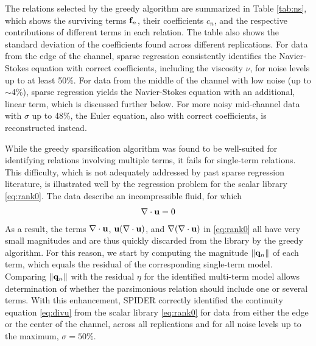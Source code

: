 \documentclass[
 reprint,
 amsmath,amssymb,
 aps,
]{revtex4-2}
\begin{document}
The relations selected by the greedy algorithm are summarized in Table \ref{tab:ns}, which shows the surviving terms ${\bf f}_n$, their coefficients $c_n$, and the respective contributions of different terms in each relation. The table also shows the standard deviation of the coefficients found across different replications. For data from the edge of the channel, sparse regression consistently identifies the Navier-Stokes equation with correct coefficients, including the viscosity $\nu$, for noise levels up to at least 50\%. For data from the middle of the channel with low noise (up to $\sim$4\%), sparse regression yields the Navier-Stokes equation with an additional, linear term, which is discussed further below. For more noisy mid-channel data with $\sigma$ up to 48\%, the Euler equation, also with correct coefficients, is reconstructed instead.

While the greedy sparsification algorithm was found to be well-suited for identifying relations involving multiple terms, it fails for single-term relations. This difficulty, which is not adequately addressed by past sparse regression literature, is illustrated well by the regression problem for the scalar library \eqref{eq:rank0}. The data describe an incompressible fluid, for which 
\begin{align}\label{eq:divu}
    \nabla\cdot{\bf u}=0
\end{align}
As a result, the terms $\nabla\cdot{\bf u}$, ${\bf u}(\nabla\cdot{\bf u})$, and $\nabla(\nabla\cdot{\bf u})$ in \eqref{eq:rank0} all have very small magnitudes and are thus quickly discarded from the library by the greedy algorithm. 
For this reason, we start by computing the magnitude $\|{\bf q}_n\|$ of each term, which equals the residual of the corresponding single-term model. Comparing $\|{\bf q}_n\|$ with the residual $\eta$ for the identified multi-term model allows determination of whether the parsimonious relation should include one or several terms. With this enhancement, SPIDER correctly identified the continuity equation \eqref{eq:divu} from the scalar library \eqref{eq:rank0} for data from either the edge or the center of the channel, across all replications and for all noise levels up to the maximum, $\sigma = 50\%$.
\end{document}
